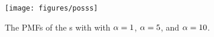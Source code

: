 \begin{enumerate}
\begin{enumerate}
\begin{solution}
\begin{enumerate}
			\begin{figure}\begin{center}
			\texttt{[image: figures/posss]}
			\caption{The PMFs of the \possrv s with
			with $\alpha=1$, $\alpha=5$, and $\alpha=10$.}
			\label{fig-posss}
			\end{center}\end{figure}
		\end{enumerate}
		\end{solution}
		\fi
	\end{enumerate}


\end{enumerate}




